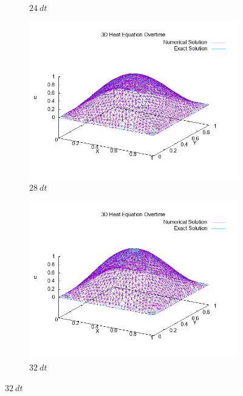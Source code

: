 \documentclass[a4paper,10pt]{article}
\begin{document}
\begin{figure}[h!]
\begin{subfigure}{.5\textwidth}
		\caption{$ 24 \ dt $}
		\label{}
	\end{subfigure}
	\begin{subfigure}{.5\textwidth}
		\centering
		\includegraphics[width=0.9\linewidth]{picture/heatplot_frame-028}
		\caption{$ 28 \ dt $}
		\label{}
	\end{subfigure}
	\begin{subfigure}{.5\textwidth}
		\centering
		\includegraphics[width=0.9\linewidth]{picture/heatplot_frame-032}
		\caption{$ 32 \ dt $}
		\label{}
	\end{subfigure}
\end{figure}
\end{document}
